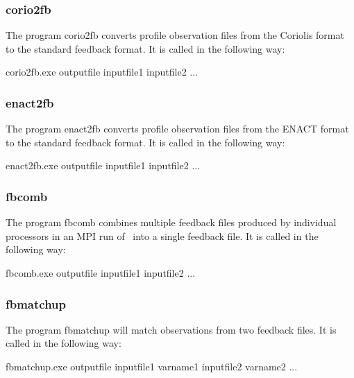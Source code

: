 \documentclass[../main/NEMO_manual]{subfiles}
\begin{document}
\subsubsection{corio2fb}

The program corio2fb converts profile observation files from the Coriolis format to the standard feedback format.
It is called in the following way:

\begin{cmds}
corio2fb.exe outputfile inputfile1 inputfile2 ...
\end{cmds}

\subsubsection{enact2fb}

The program enact2fb converts profile observation files from the ENACT format to the standard feedback format.
It is called in the following way:

\begin{cmds}
enact2fb.exe outputfile inputfile1 inputfile2 ...
\end{cmds}

\subsubsection{fbcomb}

The program fbcomb combines multiple feedback files produced by individual processors in
an MPI run of \NEMO\ into a single feedback file.
It is called in the following way:

\begin{cmds}
fbcomb.exe outputfile inputfile1 inputfile2 ...
\end{cmds}

\subsubsection{fbmatchup}

The program fbmatchup will match observations from two feedback files.
It is called in the following way:

\begin{cmds}
fbmatchup.exe outputfile inputfile1 varname1 inputfile2 varname2 ...
\end{cmds}
\end{document}
